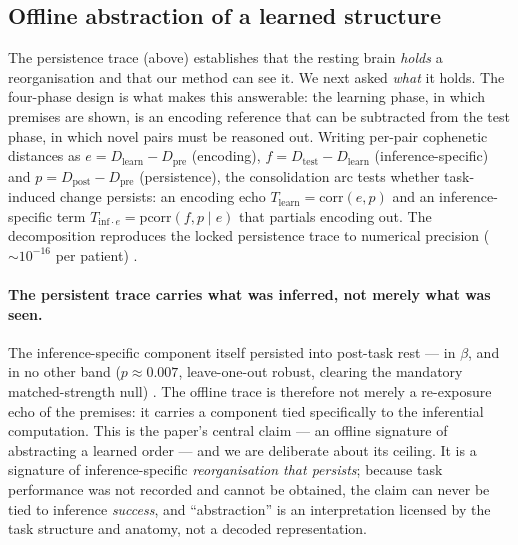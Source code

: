 \documentclass[11pt]{article}
\begin{document}
\subsection{Offline abstraction of a learned structure}

The persistence trace (above) establishes that the resting brain \emph{holds} a
reorganisation and that our method can see it. We next asked \emph{what} it
holds. The four-phase design is what makes this answerable: the learning phase,
in which premises are shown, is an encoding reference that can be subtracted from
the test phase, in which novel pairs must be reasoned out. Writing per-pair
cophenetic distances as $e = D_{\text{learn}} - D_{\text{pre}}$ (encoding),
$f = D_{\text{test}} - D_{\text{learn}}$ (inference-specific) and
$p = D_{\text{post}} - D_{\text{pre}}$ (persistence), the consolidation arc tests
whether task-induced change persists: an encoding echo $T_{\text{learn}}=
\mathrm{corr}(e,p)$ and an inference-specific term $T_{\text{inf}\cdot e}=
\mathrm{pcorr}(f,p\mid e)$ that partials encoding out. The decomposition
reproduces the locked persistence trace to numerical precision
($\sim\!10^{-16}$ per patient)
.

\paragraph{The persistent trace carries what was inferred, not merely what was
seen.}
The inference-specific component itself persisted into post-task rest --- in
$\beta$, and in no other band ($p\approx0.007$, leave-one-out robust, clearing
the mandatory matched-strength null)
. The offline trace is therefore not merely a re-exposure echo of the premises:
it carries a component tied specifically to the inferential computation. This is
the paper's central claim --- an offline signature of abstracting a learned order
--- and we are deliberate about its ceiling. It is a signature of
inference-specific \emph{reorganisation that persists}; because task performance
was not recorded and cannot be obtained, the claim can never be tied to
inference \emph{success}, and ``abstraction'' is an interpretation licensed by
the task structure and anatomy, not a decoded representation.
\end{document}
